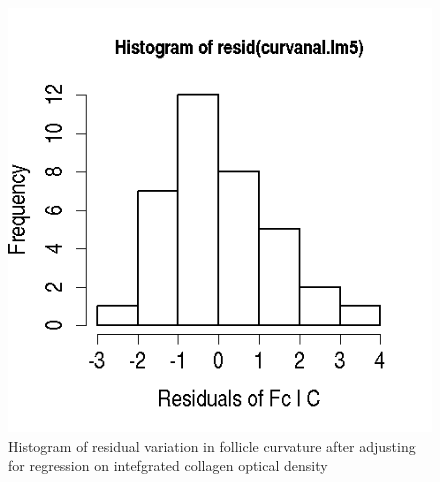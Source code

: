 %

\begin{figure}[]
\centering
    \includegraphics[scale=0.60]{fcadjchist.png}
  \caption{Histogram of residual variation in follicle curvature after adjusting for regression on intefgrated collagen optical density}
\vfill
  \label{fig:fcadjchist}
\end{figure}

%

